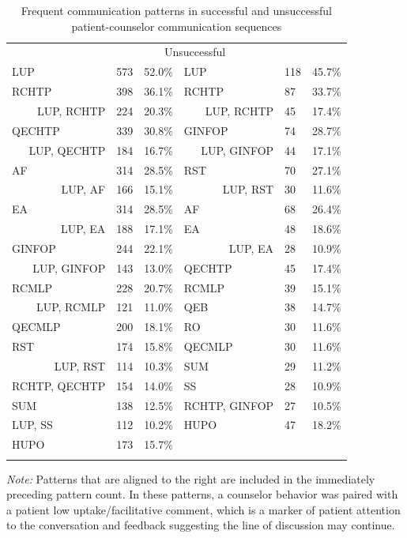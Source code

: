 \begin{table}
\begin{threeparttable}
\caption{Frequent communication patterns in successful and unsuccessful patient-counselor communication sequences}
\label{tab:patterns}   
\begin{tabularx}{\textwidth}{p{3cm}XX@{\extracolsep{4pt}}p{3cm}XX}
\hline\noalign{\smallskip}
\multicolumn{3}{c}{Successful} & \multicolumn{3}{c}{Unsuccessful} \\
\noalign{\smallskip}\cline{1-3} \cline{4-6}\noalign{\smallskip}
LUP & 573 & 52.0\% & LUP & 118 & 45.7\%  \\
RCHTP & 398 & 36.1\% & RCHTP & 87 & 33.7\% \\ 
\multicolumn{1}{r}{LUP, RCHTP} & 224 & 20.3\% & \multicolumn{1}{r}{LUP, RCHTP} & 45 & 17.4\% \\
QECHTP & 339 & 30.8\% & GINFOP & 74 & 28.7\% \\
\multicolumn{1}{r}{LUP, QECHTP} & 184 & 16.7\% & \multicolumn{1}{r}{LUP, GINFOP} & 44 & 17.1\% \\
AF & 314 & 28.5\% & RST & 70 & 27.1\% \\
\multicolumn{1}{r}{LUP, AF} & 166 & 15.1\% & \multicolumn{1}{r}{LUP, RST} & 30 & 11.6\% \\
EA & 314 & 28.5\% & AF & 68 & 26.4\% \\
\multicolumn{1}{r}{LUP, EA} & 188 & 17.1\% & EA & 48 & 18.6\% \\
GINFOP & 244 & 22.1\% & \multicolumn{1}{r}{LUP, EA} & 28 & 10.9\% \\
\multicolumn{1}{r}{LUP, GINFOP} & 143 & 13.0\% & QECHTP & 45 & 17.4\% \\
RCMLP & 228 & 20.7\% & RCMLP & 39 & 15.1\% \\
\multicolumn{1}{r}{LUP, RCMLP} & 121 & 11.0\% & QEB & 38 & 14.7\% \\
QECMLP & 200 & 18.1\% & RO & 30 & 11.6\% \\
RST & 174 & 15.8\% & QECMLP & 30 & 11.6\% \\
\multicolumn{1}{r}{LUP, RST} & 114 & 10.3\% & SUM & 29 & 11.2\% \\
RCHTP, QECHTP & 154 & 14.0\% & SS & 28 & 10.9\% \\
SUM & 138 & 12.5\% & RCHTP, GINFOP & 27 & 10.5\% \\
LUP, SS & 112 & 10.2\% & HUPO & 47 & 18.2\% \\
HUPO & 173 & 15.7\% &  &  &  \\ 
\noalign{\smallskip}\hline
\end{tabularx}
\begin{tablenotes}
      \small
      \item \textit{Note:} Patterns that are aligned to the right are included in the immediately preceding pattern count. In these patterns, a counselor behavior was paired with a patient low uptake/facilitative comment, which is a marker of patient attention to the conversation and feedback suggesting the line of discussion may continue.
\end{tablenotes}
\end{threeparttable}
\end{table}

